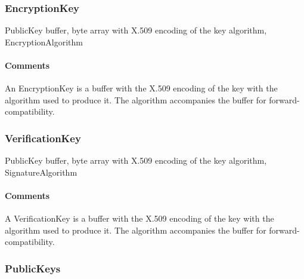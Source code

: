 \documentclass[a4paper,10pt]{article}
\begin{document}
\subsubsection{EncryptionKey}

\begin{verbbox}
PublicKey
{
  buffer, byte array with X.509 encoding of the key
  algorithm, EncryptionAlgorithm
}
\end{verbbox}
\begin{center}
\theverbbox
\end{center}

\begin{inparaitem}[ ]
 \item \infrastructure
\end{inparaitem}

\paragraph*{Comments}
An EncryptionKey is a buffer with the X.509 encoding of the key with the algorithm used to produce it. The algorithm accompanies the buffer for forward-compatibility.

\subsubsection{VerificationKey}

\begin{verbbox}
PublicKey
{
  buffer, byte array with X.509 encoding of the key
  algorithm, SignatureAlgorithm
}
\end{verbbox}
\begin{center}
\theverbbox
\end{center}

\begin{inparaitem}[ ]
 \item \infrastructure
\end{inparaitem}

\paragraph*{Comments}
A VerificationKey is a buffer with the X.509 encoding of the key with the algorithm used to produce it. The algorithm accompanies the buffer for forward-compatibility.

\subsubsection{PublicKeys}
\end{document}
